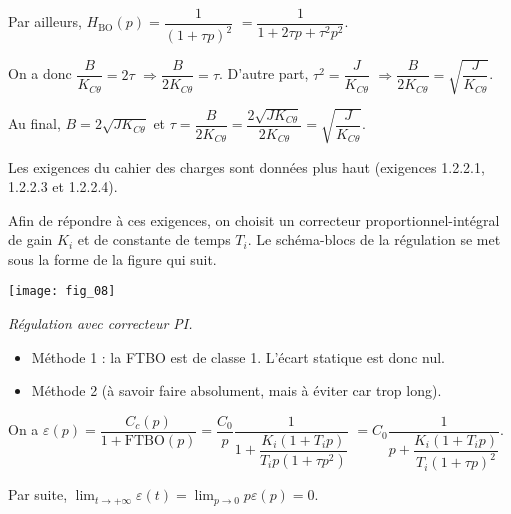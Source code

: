 \begin{multicols}{2}
\begin{corrige}
Par ailleurs, 
$H_{\text{BO}}(p)=\dfrac{1}{\left(1+\tau p\right)^2}$
$=\dfrac{1}{1+2\tau p + \tau^2 p^2}$.

On a donc $\dfrac{B}{K_{C\theta}} = 2\tau$ $\Rightarrow \dfrac{B}{2K_{C\theta}} =\tau$.
D'autre part, $ \tau^2 =\dfrac{J}{K_{C\theta}}$  $\Rightarrow \dfrac{B}{2K_{C\theta}}=\sqrt{\dfrac{J}{K_{C\theta}}}$. 


Au final, ${B}=2\sqrt{JK_{C\theta}}$ et $\tau = \dfrac{B}{2K_{C\theta}} =\dfrac{2\sqrt{JK_{C\theta}}}{2K_{C\theta}}=\sqrt{\dfrac{J}{K_{C\theta}}}$.

\end{corrige}
\else
\fi

\vspace{.25cm}

Les exigences du cahier des charges sont données plus haut (exigences 1.2.2.1, 1.2.2.3 et 1.2.2.4).

Afin de répondre à ces exigences, on choisit un correcteur proportionnel-intégral de gain $K_i$ et de constante de temps $T_i$. Le schéma-blocs de la régulation se met sous la forme de la figure qui suit.

\begin{center}
\texttt{[image: fig\_08]}

\textit{Régulation avec correcteur PI.}
\end{center}


\ifprof
\begin{corrige}
\begin{itemize}
\item Méthode 1 : la FTBO est de classe 1. L'écart statique est donc nul. 
\end{itemize}

\begin{itemize}
\item Méthode 2 (à savoir faire absolument, mais à éviter car trop long).
\end{itemize}

On a $\varepsilon(p) = \dfrac{C_c(p)}{1+\text{FTBO}(p)}=\dfrac{C_0}{p}\dfrac{1}{1+\dfrac{K_i (1+T_i p)}{T_i p (1+\tau p ^2)}}$
$=C_0\dfrac{1}{p+\dfrac{K_i (1+T_i p)}{T_i (1+\tau p )^2}}$.

Par suite, $\lim_{t\to + \infty} \varepsilon(t)=\lim_{p\to 0} p \varepsilon(p)=0$.

\end{corrige}
\else
\fi


\end{multicols}
